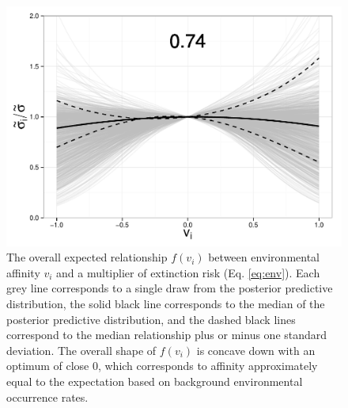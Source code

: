 \documentclass{article}
\begin{document}
\begin{figure}[ht]
  \centering
  \includegraphics[height = 0.5\textheight,width=\textwidth,keepaspectratio=true]{figure/environ_quad}
  \caption{The overall expected relationship \(f(v_{i})\) between environmental affinity \(v_{i}\) and a multiplier of extinction risk (Eq. \ref{eq:env}). Each grey line corresponds to a single draw from the posterior predictive distribution, the solid black line corresponds to the median of the posterior predictive distribution, and the dashed black lines correspond to the median relationship plus or minus one standard deviation. The overall shape of \(f(v_{i})\) is concave down with an optimum of close 0, which corresponds to affinity approximately equal to the expectation based on background environmental occurrence rates.}
  \label{fig:env_mean}
\end{figure}
\end{document}
